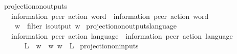 \begin{isabellebody}
\ projection{\isacharunderscore}{\kern0pt}on{\isacharunderscore}{\kern0pt}outputs\isanewline
\ \ {\isacharcolon}{\kern0pt}{\isacharcolon}{\kern0pt}\ {\isachardoublequoteopen}{\isacharparenleft}{\kern0pt}{\isacharprime}{\kern0pt}information{\isacharcomma}{\kern0pt}\ {\isacharprime}{\kern0pt}peer{\isacharparenright}{\kern0pt}\ action\ word\ {\isasymRightarrow}\ {\isacharparenleft}{\kern0pt}{\isacharprime}{\kern0pt}information{\isacharcomma}{\kern0pt}\ {\isacharprime}{\kern0pt}peer{\isacharparenright}{\kern0pt}\ action\ word{\isachardoublequoteclose}\ \ {\isacharparenleft}{\kern0pt}{\isachardoublequoteopen}{\isacharunderscore}{\kern0pt}{\isasymdown}\isactrlsub {\isacharbang}{\kern0pt}{\isachardoublequoteclose}\ {\isacharbrackleft}{\kern0pt}{}{}{\isacharbrackright}{\kern0pt}\ {}{}{}{\isacharparenright}{\kern0pt}\isanewline
\ \ \isanewline
\ \ \ \ {\isachardoublequoteopen}w{\isasymdown}\isactrlsub {\isacharbang}{\kern0pt}\ {\isasymequiv}\ filter\ is{\isacharunderscore}{\kern0pt}output\ w{\isachardoublequoteclose}\isanewline
\isanewline
{}\isamarkupfalse%
\ projection{\isacharunderscore}{\kern0pt}on{\isacharunderscore}{\kern0pt}outputs{\isacharunderscore}{\kern0pt}language\isanewline
\ \ {\isacharcolon}{\kern0pt}{\isacharcolon}{\kern0pt}\ {\isachardoublequoteopen}{\isacharparenleft}{\kern0pt}{\isacharprime}{\kern0pt}information{\isacharcomma}{\kern0pt}\ {\isacharprime}{\kern0pt}peer{\isacharparenright}{\kern0pt}\ action\ language\ {\isasymRightarrow}\ {\isacharparenleft}{\kern0pt}{\isacharprime}{\kern0pt}information{\isacharcomma}{\kern0pt}\ {\isacharprime}{\kern0pt}peer{\isacharparenright}{\kern0pt}\ action\ language{\isachardoublequoteclose}\isanewline
\ \ {\isacharparenleft}{\kern0pt}{\isachardoublequoteopen}{\isacharunderscore}{\kern0pt}{\isasymdownharpoonright}\isactrlsub {\isacharbang}{\kern0pt}{\isachardoublequoteclose}\ {\isacharbrackleft}{\kern0pt}{}{}{}{\isacharbrackright}{\kern0pt}\ {}{}{}{\isacharparenright}{\kern0pt}\isanewline
\ \ \isanewline
\ \ \ \ {\isachardoublequoteopen}L{\isasymdownharpoonright}\isactrlsub {\isacharbang}{\kern0pt}\ {\isasymequiv}\ {\isacharbraceleft}{\kern0pt}w{\isasymdown}\isactrlsub {\isacharbang}{\kern0pt}\ {\isacharbar}{\kern0pt}\ w{\isachardot}{\kern0pt}\ w\ {\isasymin}\ L{\isacharbraceright}{\kern0pt}{\isachardoublequoteclose}\isanewline
\isanewline
{}\isamarkupfalse%
\ projection{\isacharunderscore}{\kern0pt}on{\isacharunderscore}{\kern0pt}inputs\isanewline

\end{isabellebody}
